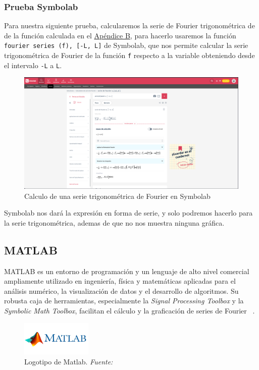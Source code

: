 \subsubsection{Prueba Symbolab}
Para nuestra siguiente prueba, calcularemos la serie de Fourier trigonométrica de de la función calculada en el \hyperref[app2:trig-coeff]{Apéndice B}, para hacerlo usaremos la función \texttt{fourier series (f), [-L, L]} de Symbolab, que nos permite calcular la serie trigonométrica de Fourier de la función \texttt{f} respecto a la variable obteniendo desde el intervalo \texttt{-L} a \texttt{L}.
\begin{figure}[H]
	\centering
	\includegraphics[width=1\textwidth]{img/chapter02/symbolab-trig-series.png}
	\caption{Calculo de una serie trigonométrica de Fourier en Symbolab}
	\label{fig:symbolab-trig-series}  %
\end{figure}
Symbolab nos dará la expresión en forma de serie, y solo podremos hacerlo para la serie trigonométrica, ademas de que no nos muestra ninguna gráfica.

\subsection{MATLAB} 
MATLAB es un entorno de programación y un lenguaje de alto nivel comercial ampliamente utilizado en ingeniería, física y matemáticas aplicadas para el análisis numérico, la visualización de datos y el desarrollo de algoritmos. Su robusta caja de herramientas, especialmente la \textit{Signal Processing Toolbox} y la \textit{Symbolic Math Toolbox}, facilitan el cálculo y la graficación de series de Fourier  ~\cite{MathWorks2024}.

\begin{figure}[H]
	\centering
	\includegraphics[width=0.3\textwidth]{img/chapter02/logo_matlab.png}
	\caption[Logotipo de Matlab.]{Logotipo de Matlab. \textit{Fuente: ~\cite{MathWorks2024}}}
	\label{fig:logo-matlab}  %
\end{figure}

